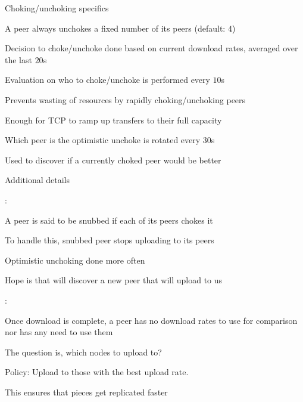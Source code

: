 \begin{frame}{Choking/unchoking specifics}

\BIL
\item A peer always unchokes a fixed number of its peers (default: $4$)
\item Decision to choke/unchoke done based on current download rates, averaged over the last $20$s
\item Evaluation on who to choke/unchoke is performed every $10$s
	\BI
	\item Prevents wasting of resources by rapidly choking/unchoking peers
	\item Enough for TCP to ramp up transfers to their full capacity
	\EI
\item Which peer is the optimistic unchoke is rotated every $30$s
	\BI
	\item Used to discover if a currently choked peer would be better
	\EI
\EIL
\end{frame}

\begin{frame}{Additional details}
	
:\\
\BIL
\item A peer is said to be \alert{snubbed} if each of its peers chokes it
\item To handle this, snubbed peer stops uploading to its peers
\item Optimistic unchoking done more often
\BI
\item Hope is that will discover a new peer that will upload to us
\EI
\EIL

:
\BIL
\item Once download is complete, a peer has no download rates to use for comparison nor has any need to use them
\item The question is, which nodes to upload to?
\item Policy: Upload to those with the best upload rate.
\BI
\item This ensures that pieces get replicated faster
\EI
\EIL

\end{frame}

